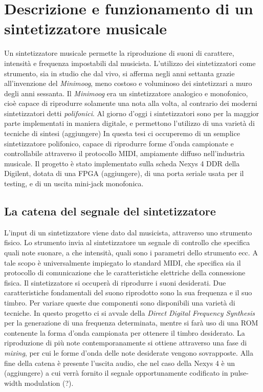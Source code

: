 \chapter{Descrizione e funzionamento di un sintetizzatore musicale}
Un sintetizzatore musicale permette la riproduzione di suoni di carattere, intensità e frequenza impostabili dal musicista.
L'utilizzo dei sintetizzatori come strumento, sia in studio che dal vivo, si afferma negli anni settanta grazie all'invenzione del \textit{Minimoog}, meno costoso e voluminoso dei sintetizzari a muro degli anni sessanta.
Il \textit{Minimoog} era un sintetizzatore analogico e monofonico, cioè capace di riprodurre solamente una nota alla volta, al contrario dei moderni sintetizzatori detti \textit{polifonici}.
Al giorno d'oggi i sintetizzatori sono per la maggior parte implementati in maniera digitale, e permettono l'utilizzo di una varietà di tecniche di sintesi (aggiungere)
In questa tesi ci occuperemo di un semplice sintetizzatore polifonico, capace di riprodurre forme d'onda campionate e controllabile attraverso il protocollo MIDI, ampiamente diffuso nell'industria musicale.
Il progetto è stato implementato sulla scheda Nexys 4 DDR della Digilent, dotata di una FPGA (aggiungere), di una porta seriale usata per il testing, e di un uscita mini-jack monofonica.

\section{La catena del segnale del sintetizzatore}
L'input di un sintetizzatore viene dato dal musicista, attraverso uno strumento fisico. Lo strumento invia al sintetizzatore un segnale di controllo che specifica quali note suonare, a che intensità, quali sono i parametri dello strumento ecc. A tale scopo è universalmente impiegato lo standard MIDI, che specifica sia il protocollo di comunicazione che le caratteristiche elettriche della connessione fisica.
Il sintetizzatore si occuperà di riprodurre i suoni desiderati. Due caratteristiche fondamentali del suono riprodotto sono la sua frequenza e il suo timbro. Per variare queste due componenti sono disponibili una varietà di tecniche.
In questo progetto ci si avvale della \textit{Direct Digital Frequency Synthesis} per la generazione di una frequenza determinata, mentre si farà uso di una ROM contenente la forma d'onda campionata per ottenere il timbro desiderato.
La riproduzione di più note contemporanamente si ottiene attraverso una fase di \textit{mixing}, per cui le forme d'onda delle note desiderate vengono sovrapposte.
Alla fine della catena è presente l'uscita audio, che nel caso della Nexys 4 è un (aggiungere) a cui verrà fornito il segnale opportunamente codificato in pulse-width modulation (?).

